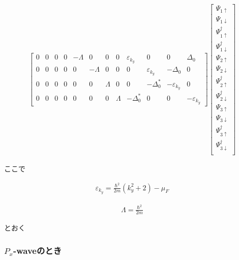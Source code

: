 \documentclass{jsarticle}
\begin{document}
\begin{align}
\begin{bmatrix}
                    0 & 0 & 0 & 0 & -\varLambda & 0 & 0 & 0 & \varepsilon_{k_y} & 0 & 0 & \Delta_0 \\
                    0 & 0 & 0 & 0 & 0 & -\varLambda & 0 & 0 & 0 & \varepsilon_{k_y} & -\Delta_0 & 0 \\
                    0 & 0 & 0 & 0 & 0 & 0 & \varLambda & 0 & 0 & -\Delta_0^\ast & -\varepsilon_{k_y} & 0 \\
                    0 & 0 & 0 & 0 & 0 & 0 & 0 & \varLambda & -\Delta_0^\ast & 0 & 0 & -\varepsilon_{k_y}
                \end{bmatrix}
                \begin{bmatrix}
                    \Psi_{1\uparrow} \\
                    \Psi_{1\downarrow} \\
                    \Psi_{1\uparrow}^\dagger \\
                    \Psi_{1\downarrow}^\dagger \\
                    \Psi_{2\uparrow} \\
                    \Psi_{2\downarrow} \\
                    \Psi_{2\uparrow}^\dagger \\
                    \Psi_{2\downarrow}^\dagger \\
                    \Psi_{3\uparrow} \\
                    \Psi_{3\downarrow} \\
                    \Psi_{3\uparrow}^\dagger \\
                    \Psi_{3\downarrow}^\dagger \\
                \end{bmatrix}
            \end{align}
    
            ここで
    
            \begin{align}
                \varepsilon_{k_y}=\frac{\hbar^2}{2m}(k_y^2+2)-\mu_F
            \end{align}
    
            \begin{align}
                \varLambda=\frac{\hbar^2}{2m}
            \end{align}
    
            とおく

            \subsubsection{$P_x$-waveのとき}
\end{document}

